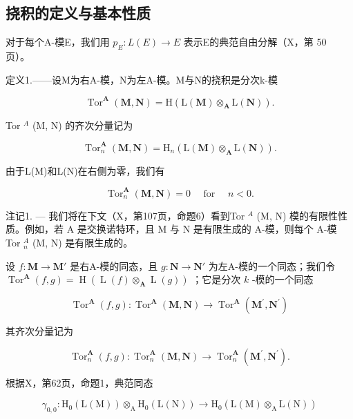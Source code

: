\subsection{挠积的定义与基本性质}

对于每个A-模E，我们用 \(p_{E}: L(E) \to E\) 表示E的典范自由分解（X，第 50 页）。

定义1.——设M为右A-模，N为左A-模。M与N的挠积是分次k-模

\[
\operatorname{Tor} ^ {\mathbf {A}} (\mathbf {M}, \mathbf {N}) = \mathrm{H} (\mathrm{L} (\mathbf {M}) \otimes_ {\mathbf {A}} \mathrm{L} (\mathbf {N}))  .\tag{4}
\]

Tor \(^{A}\) (M, N) 的齐次分量记为

\[
\operatorname{Tor} _ {n} ^ {\mathbf {A}} (\mathbf {M}, \mathbf {N}) = \mathrm{H} _ {n} (\mathrm{L} (\mathbf {M}) \otimes_ {\mathbf {A}} \mathrm{L} (\mathbf {N})).\tag{5}
\]

由于L(M)和L(N)在右侧为零，我们有

\[
\operatorname{Tor} _ {n} ^ {\mathbf {A}} (\mathbf {M}, \mathbf {N}) = 0 \quad \text { for } \quad n <   0.\tag{6}
\]

注记1. --- 我们将在下文（X，第107页，命题6）看到Tor \(^{A}\) (M, N) 模的有限性性质。例如，若 A 是交换诺特环，且 M 与 N 是有限生成的 A-模，则每个 A-模 Tor \(_{n}^{A}\) (M, N) 是有限生成的。

设 \(f: \mathbf{M} \to \mathbf{M}'\) 是右A-模的同态，且 \(g: \mathbf{N} \to \mathbf{N}'\) 为左A-模的一个同态；我们令 \(\operatorname{Tor}^{\mathbf{A}}(f, g) = \operatorname{H}\left(\operatorname{L}(f) \otimes_{\mathbf{A}} \operatorname{L}(g)\right)\) ；它是分次 \(k\) -模的一个同态

\[
\operatorname{Tor} ^ {\mathbf {A}} (f, g): \operatorname{Tor} ^ {\mathbf {A}} (\mathbf {M}, \mathbf {N}) \rightarrow \operatorname{Tor} ^ {\mathbf {A}} (\mathbf {M} ^ {\prime}, \mathbf {N} ^ {\prime})
\]

其齐次分量记为

\[
\operatorname{Tor} _ {n} ^ {\mathbf {A}} (f, g): \operatorname{Tor} _ {n} ^ {\mathbf {A}} (\mathbf {M}, \mathbf {N}) \rightarrow \operatorname{Tor} _ {n} ^ {\mathbf {A}} (\mathbf {M} ^ {\prime}, \mathbf {N} ^ {\prime}).
\]

根据X，第62页，命题1，典范同态

\[
\gamma_ {0, 0}: \mathrm{H} _ {0} (\mathrm{L} (\mathrm{M})) \otimes_ {\mathrm{A}} \mathrm{H} _ {0} (\mathrm{L} (\mathrm{N})) \rightarrow \mathrm{H} _ {0} (\mathrm{L} (\mathrm{M}) \otimes_ {\mathrm{A}} \mathrm{L} (\mathrm{N}))
\]

